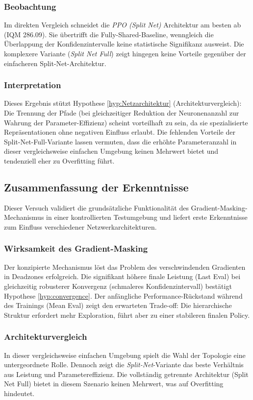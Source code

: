 \subsubsection*{Beobachtung}
Im direkten Vergleich schneidet die \textit{\ac{PPO} (Split Net)} Architektur am besten ab (\ac{IQM} 286.09). Sie übertrifft die Fully-Shared-Baseline, wenngleich die Überlappung der Konfidenzintervalle keine statistische Signifikanz ausweist. Die komplexere Variante (\textit{Split Net Full}) zeigt hingegen keine Vorteile gegenüber der einfacheren Split-Net-Architektur.

\subsubsection*{Interpretation}
Dieses Ergebnis stützt Hypothese \ref{hyp:Netzarchitektur} (Architekturvergleich): Die Trennung der Pfade (bei gleichzeitiger Reduktion der Neuronenanzahl zur Wahrung der Parameter-Effizienz) scheint vorteilhaft zu sein, da sie spezialisierte Repräsentationen ohne negativen Einfluss erlaubt. Die fehlenden Vorteile der Split-Net-Full-Variante lassen vermuten, dass die erhöhte Parameteranzahl in dieser vergleichsweise einfachen Umgebung keinen Mehrwert bietet und tendenziell eher zu Overfitting führt.

\subsection{Zusammenfassung der Erkenntnisse}

Dieser Versuch validiert die grundsätzliche Funktionalität des Gradient\hyp{}Masking\hyp{}Mechanismus in einer kontrollierten Testumgebung und liefert erste Erkenntnisse zum Einfluss verschiedener Netzwerkarchitekturen.

\subsubsection*{Wirksamkeit des Gradient-Masking}
Der konzipierte Mechanismus löst das Problem des verschwindenden Gradienten in Deadzones erfolgreich. Die signifikant höhere finale Leistung (Last Eval) bei gleichzeitig robusterer Konvergenz (schmaleres Konfidenzintervall) bestätigt Hypothese \ref{hyp:convergence}. Der anfängliche Performance-Rückstand während des Trainings (Mean Eval) zeigt den erwarteten Trade-off: Die hierarchische Struktur erfordert mehr Exploration, führt aber zu einer stabileren finalen Policy.

\subsubsection*{Architekturvergleich}
In dieser vergleichsweise einfachen Umgebung spielt die Wahl der Topologie eine untergeordnete Rolle. Dennoch zeigt die \textit{Split-Net}-Variante das beste Verhältnis aus Leistung und Parametereffizienz. Die vollständig getrennte Architektur (Split Net Full) bietet in diesem Szenario keinen Mehrwert, was auf Overfitting hindeutet.

